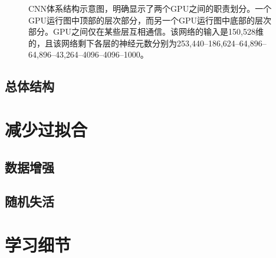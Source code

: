 \documentclass[12pt]{article}
\begin{document}
\begin{CJK*}{UTF8}{gkai}
\begin{figure}[htbp]
  \centering
  \caption{CNN体系结构示意图，明确显示了两个GPU之间的职责划分。一个GPU运行图中顶部的层次部分，而另一个GPU运行图中底部的层次部分。GPU之间仅在某些层互相通信。该网络的输入是150,528维的，且该网络剩下各层的神经元数分别为253,440–186,624–64,896–64,896–43,264–4096–4096–1000。}
  \label{fig:fig2}
\end{figure}

\subsection{总体结构}


\section{减少过拟合}


\subsection{数据增强}


\subsection{随机失活}


\section{学习细节}



\end{CJK*}
\end{document}
